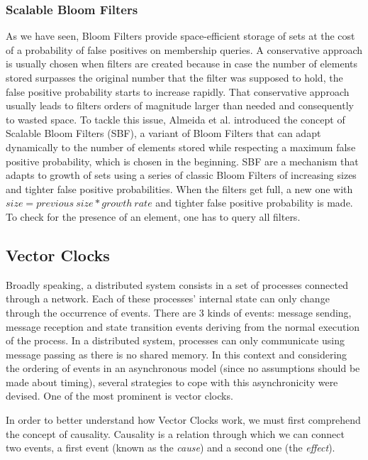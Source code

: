 \subsubsection{Scalable Bloom Filters}
\label{sec:scal-bloom-filt}

As we have seen, Bloom Filters provide space-efficient storage of sets
at the cost of a probability of false positives on membership queries.
A conservative approach is usually chosen when filters are created
because in case the number of elements stored surpasses the original
number that the filter was supposed to hold, the false positive
probability starts to increase rapidly. That conservative approach
usually leads to filters orders of magnitude larger than needed and
consequently to wasted space. To tackle this issue, Almeida et
al. \cite{Almeida2007} introduced the concept of Scalable Bloom Filters
(SBF), a variant of Bloom Filters that can adapt dynamically to the
number of elements stored while respecting a maximum false positive
probability, which is chosen in the beginning. SBF are a mechanism that
adapts to growth of sets using a series of classic Bloom Filters of
increasing sizes and tighter false positive probabilities. When the
filters get full, a new one with $size = previous\ size*growth\ rate$
and tighter false positive probability is made. To check for the
presence of an element, one has to query all filters.

\subsection{Vector Clocks}
\label{sec:vector_clocks}

Broadly speaking, a distributed system consists in a set of processes
connected through a network. Each of these processes' internal state can only
change through the occurrence of events. There are 3 kinds of events: message
sending, message reception and state transition events deriving from the
normal execution of the process. In a distributed system, processes can only
communicate using message passing as there is no shared memory. In this
context and considering the ordering of events in an asynchronous model (since
no assumptions should be made about timing), several strategies to cope with
this asynchronicity were devised. One of the most prominent is vector clocks.

In order to better understand how Vector Clocks work, we must first comprehend
the concept of causality.  Causality is a relation through which we can connect
two events, a first event (known as the \textit{cause}) and a second one (the
\textit{effect}).

